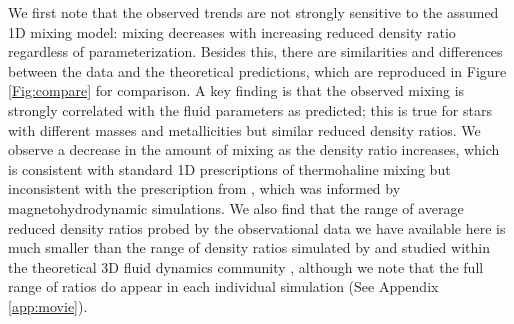We first note that the observed trends are not strongly sensitive to the assumed 1D mixing model: mixing decreases with increasing reduced density ratio regardless of parameterization.
%
Besides this, there are similarities and differences between the data and the theoretical predictions, which are reproduced in Figure \ref{Fig:compare} for comparison. A key finding is that the observed mixing is strongly correlated with the fluid parameters as predicted; this is true for stars with different masses and metallicities but similar reduced density ratios. %
We observe a decrease in the amount of mixing as the density ratio increases, which is consistent with standard 1D prescriptions of thermohaline mixing but inconsistent with the prescription from \citet{harrington}, which was informed by magnetohydrodynamic simulations. %
We also find that the range of average reduced density ratios probed by the observational data we have available here is much smaller than the range of density ratios simulated by and studied within the theoretical 3D fluid dynamics community \citep[e.g.][]{brown_etal_2013}, although we note that the full range of ratios do appear in each individual simulation (See Appendix \ref{app:movie}).%



